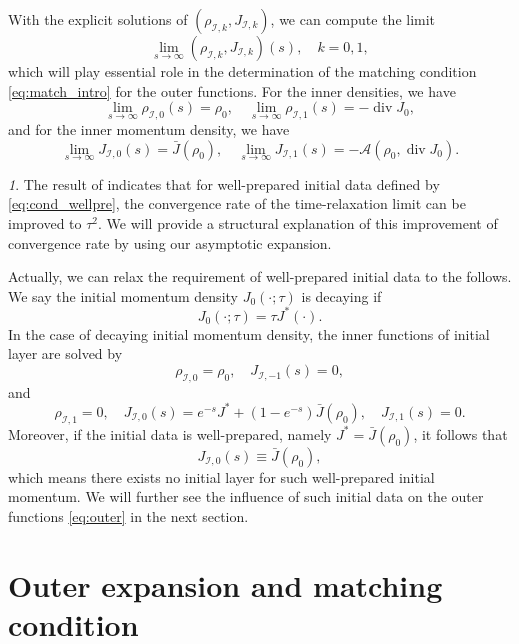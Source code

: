 \documentclass[english]{amsart}
\theoremstyle{plain}
\theoremstyle{definition}
\theoremstyle{remark}
\newtheorem{rem}[thm]{\protect\remarkname}
\theoremstyle{plain}
\theoremstyle{plain}
\theoremstyle{plain}
\providecommand{\remarkname}{Remark}
\DeclareMathOperator{\diver}{div}
\numberwithin{equation}{section}
\begin{document}
With the explicit solutions of $(\rho_{\mathcal{I},k},J_{\mathcal{I},k})$, we can compute the limit
\[
\lim_{s\to\infty}(\rho_{\mathcal{I},k},J_{\mathcal{I},k})(s),\quad k=0,1,
\]
which will play essential role in the determination of the matching condition \eqref{eq:match_intro} for the outer functions. For the inner densities, we have
\begin{equation}\label{eq:infty_in_dens}
\lim_{s\to\infty}\rho_{\mathcal{I},0}(s)=\rho_0,\quad \lim_{s\to\infty}\rho_{\mathcal{I},1}(s)=-\diver J_0,
\end{equation}
and for the inner momentum density, we have
\begin{equation}\label{eq:infty_in_mom}
\lim_{s\to\infty}J_{\mathcal{I},0}(s)=\bar J(\rho_0),\quad \lim_{s\to\infty}J_{\mathcal{I},1}(s)=-\mathcal{A}(\rho_0,\diver J_0).
\end{equation}


\begin{rem}\label{rem:wellpre}
The result of \cite{LT} indicates that for well-prepared initial data defined by \eqref{eq:cond_wellpre}, the convergence rate of the time-relaxation limit can be improved to $\tau^2$. We will provide a structural explanation of this improvement of convergence rate by using our asymptotic expansion.

Actually, we can relax the requirement of well-prepared initial data to the follows. We say the initial momentum density $J_0(\cdot;\tau)$ is decaying if
\begin{equation}\label{eq:cond_decay}
J_0(\cdot;\tau)=\tau J^*(\cdot).
\end{equation}
In the case of decaying initial momentum density, the inner functions of initial layer are solved by
\[
\rho_{\mathcal{I},0}=\rho_0,\quad J_{\mathcal{I},-1}(s)=0,
\] 
and
\[
\rho_{\mathcal{I},1}=0,\quad J_{\mathcal{I},0}(s)=e^{-s}J^*+(1-e^{-s})\bar J(\rho_0),\quad J_{\mathcal{I},1}(s)=0.
\]
Moreover, if the initial data is well-prepared, namely $J^*=\bar J(\rho_0)$, it follows that
\[
J_{\mathcal{I},0}(s)\equiv \bar J(\rho_0),
\]
which means there exists no initial layer for such well-prepared initial momentum. We will further see the influence of such initial data on the outer functions \eqref{eq:outer} in the next section.  
\end{rem}




\section{Outer expansion and matching condition}\label{sect:outer}
\end{document}

